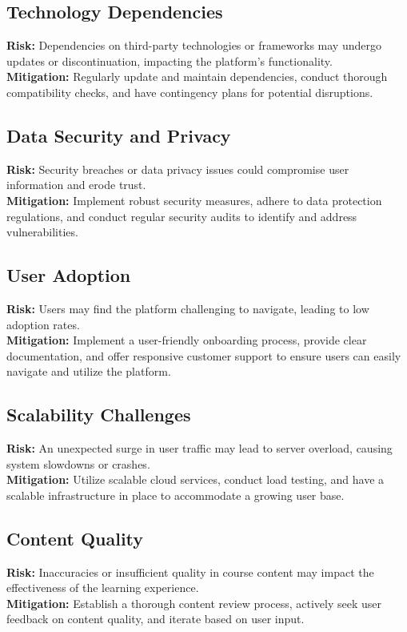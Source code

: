 \subsection{Technology Dependencies}
\textbf{Risk:} Dependencies on third-party technologies or frameworks may undergo updates or discontinuation, impacting the platform's functionality. \\
\textbf{Mitigation:} Regularly update and maintain dependencies, conduct thorough compatibility checks, and have contingency plans for potential disruptions.

\subsection{Data Security and Privacy}
\textbf{Risk:} Security breaches or data privacy issues could compromise user information and erode trust. \\
\textbf{Mitigation:} Implement robust security measures, adhere to data protection regulations, and conduct regular security audits to identify and address vulnerabilities.

\subsection{User Adoption}
\textbf{Risk:} Users may find the platform challenging to navigate, leading to low adoption rates. \\
\textbf{Mitigation:} Implement a user-friendly onboarding process, provide clear documentation, and offer responsive customer support to ensure users can easily navigate and utilize the platform.

\newpage 

\subsection{Scalability Challenges}
\textbf{Risk:} An unexpected surge in user traffic may lead to server overload, causing system slowdowns or crashes. \\
\textbf{Mitigation:} Utilize scalable cloud services, conduct load testing, and have a scalable infrastructure in place to accommodate a growing user base.

\subsection{Content Quality}
\textbf{Risk:} Inaccuracies or insufficient quality in course content may impact the effectiveness of the learning experience. \\
\textbf{Mitigation:} Establish a thorough content review process, actively seek user feedback on content quality, and iterate based on user input.

